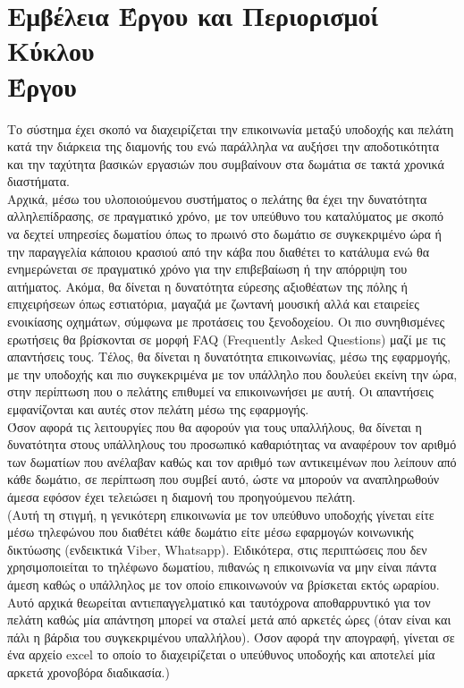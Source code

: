 \section{Εμβέλεια Έργου και Περιορισμοί Κύκλου \\Έργου}		
Το σύστημα έχει σκοπό να διαχειρίζεται την επικοινωνία μεταξύ υποδοχής και πελάτη κατά την διάρκεια 
της διαμονής του ενώ παράλληλα να αυξήσει την αποδοτικότητα και την ταχύτητα βασικών εργασιών που 
συμβαίνουν στα δωμάτια σε τακτά χρονικά διαστήματα.\\

\noindent
Αρχικά, μέσω του υλοποιούμενου συστήματος ο πελάτης θα έχει την δυνατότητα αλληλεπίδρασης, σε 
πραγματικό χρόνο, με τον υπεύθυνο του καταλύματος με σκοπό να δεχτεί υπηρεσίες δωματίου όπως το 
πρωινό στο δωμάτιο σε συγκεκριμένο ώρα ή την παραγγελία κάποιου κρασιού από την κάβα που διαθέτει το 
κατάλυμα ενώ θα ενημερώνεται σε πραγματικό χρόνο για την επιβεβαίωση ή την απόρριψη του αιτήματος. 
Ακόμα, θα δίνεται η δυνατότητα εύρεσης αξιοθέατων της πόλης ή επιχειρήσεων όπως εστιατόρια, μαγαζιά 
με ζωντανή μουσική αλλά και εταιρείες ενοικίασης οχημάτων, σύμφωνα με προτάσεις του ξενοδοχείου. Οι 
πιο συνηθισμένες ερωτήσεις θα βρίσκονται σε μορφή FAQ (Frequently Asked Questions) μαζί με τις 
απαντήσεις τους. Τέλος, θα δίνεται η δυνατότητα επικοινωνίας, μέσω της εφαρμογής, με την υποδοχής και 
πιο συγκεκριμένα με τον υπάλληλο που δουλεύει εκείνη την ώρα, στην περίπτωση που ο πελάτης επιθυμεί 
να επικοινωνήσει με αυτή. Οι απαντήσεις εμφανίζονται και αυτές στον πελάτη μέσω της εφαρμογής. \\

\noindent
Όσον αφορά τις λειτουργίες που θα αφορούν για τους υπαλλήλους, θα δίνεται η δυνατότητα στους 
υπάλληλους του προσωπικό καθαριότητας να αναφέρουν τον αριθμό των δωματίων που ανέλαβαν καθώς και τον 
αριθμό των αντικειμένων που λείπουν από κάθε δωμάτιο, σε περίπτωση που συμβεί αυτό, ώστε να μπορούν 
να αναπληρωθούν άμεσα εφόσον έχει τελειώσει η διαμονή του προηγούμενου πελάτη. \\

\noindent
(Αυτή τη στιγμή, η γενικότερη επικοινωνία με τον υπεύθυνο υποδοχής γίνεται είτε μέσω τηλεφώνου που 
διαθέτει κάθε δωμάτιο είτε μέσω εφαρμογών κοινωνικής δικτύωσης (ενδεικτικά Viber, Whatsapp). 
Ειδικότερα, στις περιπτώσεις που δεν χρησιμοποιείται το τηλέφωνο δωματίου, πιθανώς η επικοινωνία να 
μην είναι πάντα άμεση καθώς ο υπάλληλος με τον οποίο επικοινωνούν να βρίσκεται εκτός ωραρίου. Αυτό 
αρχικά θεωρείται αντιεπαγγελματικό και ταυτόχρονα αποθαρρυντικό για τον πελάτη καθώς μία απάντηση 
μπορεί να σταλεί μετά από αρκετές ώρες (όταν είναι και πάλι η βάρδια του συγκεκριμένου υπαλλήλου). 
Όσον αφορά την απογραφή, γίνεται σε ένα αρχείο excel το οποίο το  διαχειρίζεται ο υπεύθυνος υποδοχής 
και αποτελεί μία αρκετά χρονοβόρα διαδικασία.) \\

